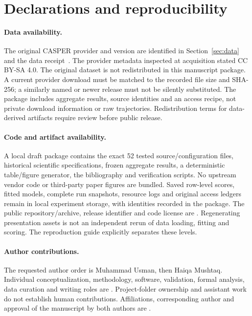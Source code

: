 \section*{Declarations and reproducibility}
\paragraph{Data availability.}
The original CASPER provider and version are identified in Section~\ref{sec:data} and the data receipt~\cite{casperdata}. The provider metadata inspected at acquisition stated CC BY-SA 4.0. The original dataset is not redistributed in this manuscript package. A current provider download must be matched to the recorded file size and SHA-256; a similarly named or newer release must not be silently substituted. The package includes aggregate results, source identities and an access recipe, not private download information or raw trajectories. Redistribution terms for data-derived artifacts require review before public release.

\paragraph{Code and artifact availability.}
A local draft package contains the exact 52 tested source/configuration files, historical scientific specifications, frozen aggregate results, a deterministic table/figure generator, the bibliography and verification scripts. No upstream vendor code or third-party paper figures are bundled. Saved row-level scores, fitted models, complete run snapshots, resource logs and original access ledgers remain in local experiment storage, with identities recorded in the package. The public repository/archive, release identifier and code license are . Regenerating presentation assets is not an independent rerun of data loading, fitting and scoring. The reproduction guide explicitly separates these levels.

\paragraph{Author contributions.}
The requested author order is Muhammad Usman, then Haiqa Mushtaq. Individual conceptualization, methodology, software, validation, formal analysis, data curation and writing roles are . Project-folder ownership and assistant work do not establish human contributions. Affiliations, corresponding author and approval of the manuscript by both authors are .

